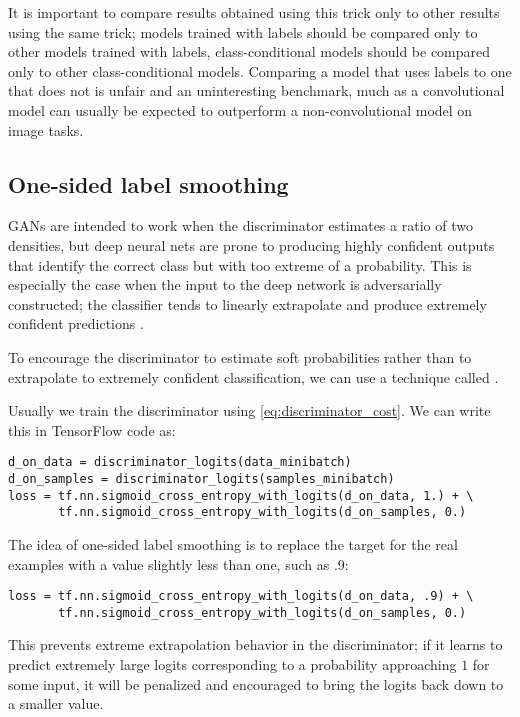  It is important to compare results obtained using this trick only to other
 results using the same trick; models trained with labels should be compared
 only to other models trained with labels, class-conditional models should
 be compared only to other class-conditional models.
 Comparing a model that uses labels to one that does not is unfair and an
 uninteresting benchmark, much as a convolutional model can usually be expected
 to outperform a non-convolutional model on image tasks.

\subsection{One-sided label smoothing}
\label{sec:label_smooth}

GANs are intended to work when the discriminator estimates a ratio of two
densities, but deep neural nets are prone to producing highly confident
outputs that identify the correct class but with too extreme of a probability.
This is especially the case when the input to the deep network is adversarially
constructed; the classifier tends to linearly extrapolate and produce
extremely confident predictions \citep{Goodfellow-2015-adversarial}.

To encourage the discriminator to estimate soft probabilities rather than
to extrapolate to extremely confident classification, we can use a technique
called  \citep{salimans2016improved}.

Usually we train the discriminator using \eqref{eq:discriminator_cost}.
We can write this in TensorFlow \citep{tensorflow} code as:
\begin{lstlisting}
d_on_data = discriminator_logits(data_minibatch)
d_on_samples = discriminator_logits(samples_minibatch)
loss = tf.nn.sigmoid_cross_entropy_with_logits(d_on_data, 1.) + \
       tf.nn.sigmoid_cross_entropy_with_logits(d_on_samples, 0.)
\end{lstlisting}

The idea of one-sided label smoothing is to replace the target for the real examples
with a value slightly less than one, such as .9:

\begin{lstlisting}
loss = tf.nn.sigmoid_cross_entropy_with_logits(d_on_data, .9) + \
       tf.nn.sigmoid_cross_entropy_with_logits(d_on_samples, 0.)
\end{lstlisting}

This prevents extreme extrapolation behavior in the discriminator; if it learns
to predict extremely large logits corresponding to a probability approaching $1$
for some input, it will be penalized and encouraged to bring the logits back
down to a smaller value.

